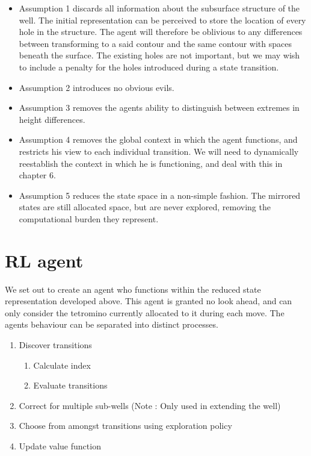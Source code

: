 \documentclass{rucsthesis}
\begin{document}
\begin{itemize}
\item{Assumption 1 discards all information about the subsurface structure of the well. The initial representation can be perceived to store the location of every hole in the structure. The agent will therefore be oblivious to any differences between transforming to a said contour and the same contour with spaces beneath the surface. The existing holes are not important, but we may wish to include a penalty for the holes introduced during a state transition.}
\item{Assumption 2 introduces no obvious evils.}
\item{Assumption 3 removes the agents ability to distinguish between extremes in height differences.}
\item{Assumption 4 removes the global context in which the agent functions, and restricts his view to each individual transition. We will need to dynamically reestablish the context in which he is functioning, and deal with this in chapter 6.}
\item{Assumption 5 reduces the state space in a non-simple fashion. The mirrored states are still allocated space, but are never explored, removing the computational burden they represent.}
\end{itemize}

\section{RL agent}

We set out to create an agent who functions within the reduced state representation developed above. This agent is granted no look ahead, and can only consider the tetromino currently allocated to it during each move. The agents behaviour can be separated into distinct processes.

\begin{enumerate}
\item{Discover transitions}
\begin{enumerate}
\item{Calculate index}
\item{Evaluate transitions}
\end{enumerate}
\item{Correct for multiple sub-wells (Note : Only used in extending the well) }
\item{Choose from amongst transitions using exploration policy}
\item{Update value function}
\end{enumerate}
\end{document}
